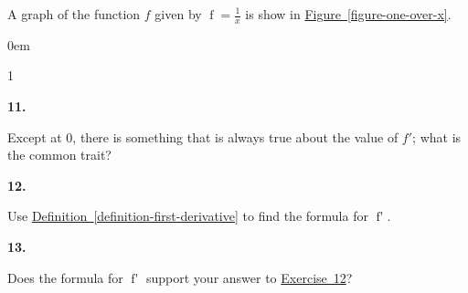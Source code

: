 \documentclass[12pt,]{book}
\theoremstyle{plain}
\theoremstyle{definition}
\numberwithin{equation}{section}
\newcounter{figstack}
\newcounter{figindex}
\newlength\fight
\newcommand\pushValignCaptionBottom[5][b]{%
\stepcounter{figstack}%
\expandafter\def\csname %
figalign\romannumeral\value{figstack}\endcsname{#1}%
\expandafter\def\csname %
figtype\romannumeral\value{figstack}\endcsname{#2}%
\expandafter\def\csname %
figwd\romannumeral\value{figstack}\endcsname{#3}%
\expandafter\def\csname %
figcontent\romannumeral\value{figstack}\endcsname{#4}%
\expandafter\def\csname %
figcap\romannumeral\value{figstack}\endcsname{#5}%
\setbox0=\hbox{%
\begin{#2}{#3}#4\end{#2}}%
\ifdim\dimexpr\ht0+\dp0\relax>\fight\global\setlength{\fight}{%
\dimexpr\ht0+\dp0\relax}\fi%
}
\newcommand\popValignCaptionBottom{%
\setcounter{figindex}{0}%
\hfill%
\whiledo{\value{figindex}<\value{figstack}}{%
\stepcounter{figindex}%
\def\tmp{\csname figwd\romannumeral\value{figindex}\endcsname}%
\begin{\csname figtype\romannumeral\value{figindex}\endcsname}[t]{\tmp}%
\centering%
\stackinset{c}{}%
{\csname figalign\romannumeral\value{figindex}\endcsname}{}%
{\csname figcontent\romannumeral\value{figindex}\endcsname}%
{\rule{0pt}{\fight}}\par%
\csname figcap\romannumeral\value{figindex}\endcsname%
\end{\csname figtype\romannumeral\value{figindex}\endcsname}%
\hfill%
}%
\setcounter{figstack}{0}%
\setlength{\fight}{0pt}%
\hfill%
}
\newenvironment{exercisegroup}%
{\medskip\noindent}%
{\par\bigskip}%
\newlength{\exercisegroupindent}%
\newlength{\exercisegroupitemwidth}%
\newenvironment{exercisegrouplist}%
{\vspace{-\partopsep}%
\begin{adjustwidth}{\exercisegroupindent}{0em}}%
{\end{adjustwidth}%
\vspace{-\partopsep}%
\vspace{\baselineskip}}%
\newenvironment{exercisegroupbycol}[1]%
{\begin{exercisegrouplist}%
\vspace{-\multicolsep}%
\begin{multicols}{#1}%
\setlength{\parindent}{0em}%
\setlength{\exercisegroupitemwidth}{\linewidth}}%
{\end{multicols}%
\vspace{-\multicolsep}%
\end{exercisegrouplist}}%
\newenvironment{exercisegroupitem}[1]%
{\begin{minipage}[t]{\exercisegroupitemwidth}
\vspace{0pt}%
{\bfseries#1}%
\rule{0pt}{\baselineskip}}{\strut%
\end{minipage}%
\hspace{\columnsep}}%
\providecommand\phantomsection{}
\newcommand{\fe}[2]{\mathop{{#1}{\left(#2\right)}}}
\newcommand{\fd}[1]{#1'}
\begin{document}
\begin{exerciselist}
\begin{exercisegroup}%
A graph of the function \(f\) given by \(\fe{f}{x}=\frac{1}{x}\) is show in \hyperref[figure-one-over-x]{Figure~\ref*{figure-one-over-x}}.%
\par
\begin{exercisegroupbycol}{1}%
\begin{exercisegroupitem}{11. }\phantomsection\hypertarget{exercise-negative-derivative-of-one-over-x}{\null}
Except at \(0\), there is something that is always true about the value of \(\fd{f}\); what is the common trait?%
\end{exercisegroupitem}%
\par%
\begin{exercisegroupitem}{12. }\phantomsection\hypertarget{exercise-derivative-of-one-over-x}{\null}
Use \hyperref[definition-first-derivative]{Definition~\ref*{definition-first-derivative}} to find the formula for \(\fe{\fd{f}}{x}\).%
\end{exercisegroupitem}%
\par%
\begin{exercisegroupitem}{13. }\phantomsection\hypertarget{exercise-222}{\null}
Does the formula for \(\fe{\fd{f}}{x}\) support your answer to \hyperref[exercise-derivative-of-one-over-x]{Exercise~12}?%

\end{exercisegroupitem}
\end{exercisegroupbycol}
\end{exercisegroup}
\end{exerciselist}
\end{document}
